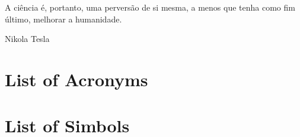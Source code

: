 \documentclass{ufpatcc}
\begin{document}

\begin{ufpaEpigrafe}
A ci\^{e}ncia \'{e}, portanto, uma pervers\~{a}o de si mesma, a menos que tenha
como fim \'{u}ltimo, melhorar a humanidade.\\
\begin{flushright}Nikola Tesla\end{flushright}
\end{ufpaEpigrafe}


\chapter*{List of Acronyms} \label{sec:siglas}


\chapter*{List of Simbols} \label{sec:simbolos}



\listoffigures \clearpage


\tableofcontents    \clearpage

\end{document}

